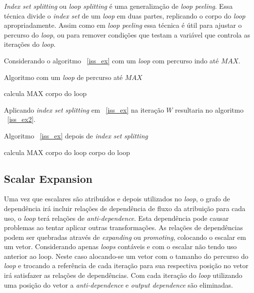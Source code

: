 \textit{Index set splitting} ou \textit{loop splitting} é uma generalização de 
\textit{loop peeling}. Essa técnica divide o \textit{index set} de um
\textit{loop} em duas partes, replicando o corpo do \textit{loop}
apropriadamente. 
Assim como em \textit{loop peeling} essa técnica é útil para ajustar o percurso
do \textit{loop}, ou para remover condições que testam a variável que controla
as iterações do \textit{loop}.

Considerando o algoritmo ~\ref{iss_ex} com um \textit{loop} com percurso indo
até $MAX$.

\begin{algorithm}
\caption{Algoritmo com um \textit{loop} de percurso até $MAX$}
\label{iss_ex}
\begin{algorithmic}[1]

\STATE calcula MAX
\STATE corpo do loop
\ENDFOR

\end{algorithmic}
\end{algorithm}

Aplicando \textit{index set splitting} em ~\ref{iss_ex} na iteração $W$
resultaria no algoritmo ~\ref{iss_ex2}.

\begin{algorithm}
\caption{Algoritmo ~\ref{iss_ex} depois de \textit{index set splitting}}
\label{iss_ex2}
\begin{algorithmic}[1]

\STATE calcula MAX
\STATE corpo do loop
\ENDFOR
{}
\STATE corpo do loop
\ENDFOR

\end{algorithmic}
\end{algorithm}


\subsection{Scalar Expansion} 

Uma vez que escalares são atribuídos e depois utilizados no \textit{loop}, o 
grafo de dependência irá incluir relações de dependência de fluxo da atribuição 
para cada uso, o \textit{loop} terá relações de \textit{anti-dependence}.
Esta dependência pode causar problemas ao tentar aplicar outras transformações.
As relações de dependências podem ser quebradas através de \textit{expanding} ou 
\textit{promoting}, colocando o escalar em um vetor.
Considerando apenas \textit{loops} contáveis e com o escalar não tendo uso
anterior ao loop. Neste caso alocando-se um vetor com o tamanho do percurso do
\textit{loop} e trocando a referência de cada iteração para sua respectiva
posição no vetor irá satisfazer as relações de dependências. Com cada iteração
do \textit{loop} utilizando uma posição do vetor a \textit{anti-dependence} e 
\textit{output dependence} são eliminadas.

